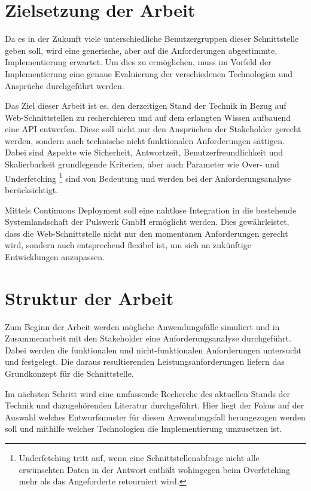 \documentclass[draft,final]{vutinfth} %
\begin{document}
 
\section{Zielsetzung der Arbeit}

Da es in der Zukunft viele unterschiedliche Benutzergruppen dieser Schnittstelle geben soll, wird eine generische, aber auf die Anforderungen abgestimmte, Implementierung erwartet. 
Um dies zu ermöglichen, muss im Vorfeld der Implementierung eine genaue Evaluierung der verschiedenen Technologien und Ansprüche durchgeführt werden.
 
Das Ziel dieser Arbeit ist es, den derzeitigen Stand der Technik in Bezug auf Web-Schnittstellen zu recherchieren und auf dem erlangten Wissen aufbauend eine API entwerfen.
Diese soll nicht nur den Ansprüchen der Stakeholder gerecht werden, sondern auch technische nicht funktionalen Anforderungen sättigen.
Dabei sind Aspekte wie Sicherheit, Antwortzeit, Benutzerfreundlichkeit und Skalierbarkeit grundlegende Kriterien, aber auch Parameter wie Over- und Underfetching
\footnote{
	Underfetching tritt auf, wenn eine Schnittstellenabfrage nicht alle erwünschten Daten in der Antwort enthält wohingegen beim Overfetching mehr als das Angeforderte retourniert wird.
} 
sind von Bedeutung und werden bei der Anforderungsanalyse berücksichtigt. 

Mittels Continuous Deployment soll eine nahtlose Integration in die bestehende Systemlandschaft der Pulswerk GmbH ermöglicht werden. 
Dies gewährleistet, dass die Web-Schnittstelle nicht nur den momentanen Anforderungen gerecht wird, sondern auch entsprechend flexibel ist, um sich an zukünftige Entwicklungen anzupassen.


\section{Struktur der Arbeit}

Zum Beginn der Arbeit werden mögliche Anwendungsfälle simuliert und in Zusammenarbeit mit den Stakeholder eine Anforderungsanalyse durchgeführt. 
Dabei werden die funktionalen und nicht-funktionalen Anforderungen untersucht und festgelegt.
Die daraus resultierenden Leistungsanforderungen liefern das Grundkonzept für die Schnittstelle. 

Im nächsten Schritt wird eine umfassende Recherche des aktuellen Stands der Technik und dazugehörenden Literatur durchgeführt. 
Hier liegt der Fokus auf der Auswahl welches Entwurfsmuster für diesen Anwendungsfall herangezogen werden soll und mithilfe welcher Technologien die Implementierung umzusetzen ist. 
\end{document}
